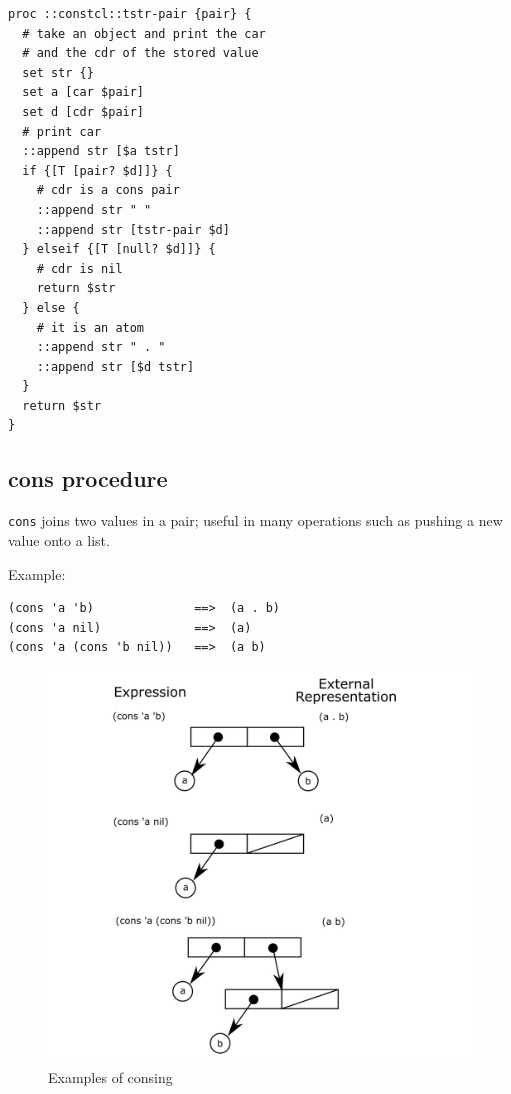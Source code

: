 \documentclass[twoside]{report}
\begin{document}
\begin{lstlisting}
proc ::constcl::tstr-pair {pair} {
  # take an object and print the car
  # and the cdr of the stored value
  set str {}
  set a [car $pair]
  set d [cdr $pair]
  # print car
  ::append str [$a tstr]
  if {[T [pair? $d]]} {
    # cdr is a cons pair
    ::append str " "
    ::append str [tstr-pair $d]
  } elseif {[T [null? $d]]} {
    # cdr is nil
    return $str
  } else {
    # it is an atom
    ::append str " . "
    ::append str [$d tstr]
  }
  return $str
}
\end{lstlisting}

\subsection{cons procedure}
\label{cons-procedure}

\texttt{cons} joins two values in a pair; useful in many operations such as pushing a new value onto a list.

Example:

\begin{verbatim}
(cons 'a 'b)              ==>  (a . b)
(cons 'a nil)             ==>  (a)
(cons 'a (cons 'b nil))   ==>  (a b)
\end{verbatim}

\begin{figure}[h!]\includegraphics{images/consing.png}\captionsetup{labelformat=empty}\caption{Examples of consing}\label{fig:examples-of-consing}\end{figure}
\end{document}
